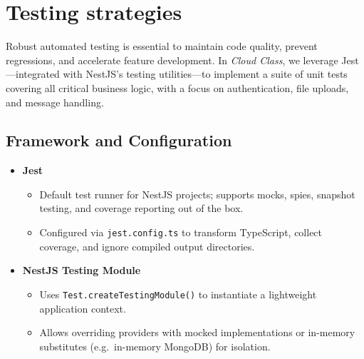 


\section{Testing strategies}

Robust automated testing is essential to maintain code quality, prevent regressions, and accelerate feature development.  In \emph{Cloud Class}, we leverage Jest—integrated with NestJS’s testing utilities—to implement a suite of unit tests covering all critical business logic, with a focus on authentication, file uploads, and message handling.

\subsection{Framework and Configuration}

\begin{itemize}
  \item \textbf{Jest}  
    \begin{itemize}
      \item Default test runner for NestJS projects; supports mocks, spies, snapshot testing, and coverage reporting out of the box.
      \item Configured via \texttt{jest.config.ts} to transform TypeScript, collect coverage, and ignore compiled output directories.
    \end{itemize}

  \item \textbf{NestJS Testing Module}  
    \begin{itemize}
      \item Uses \texttt{Test.createTestingModule()} to instantiate a lightweight application context.
      \item Allows overriding providers with mocked implementations or in-memory substitutes (e.g.\ in-memory MongoDB) for isolation.
    \end{itemize}
\end{itemize}

